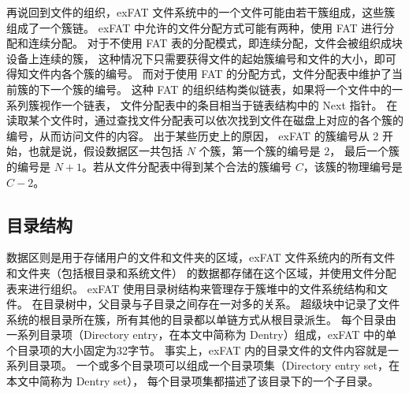 再说回到文件的组织，exFAT 文件系统中的一个文件可能由若干簇组成，这些簇组成了一个簇链。
exFAT 中允许的文件分配方式可能有两种，使用 FAT 进行分配和连续分配。
对于不使用 FAT 表的分配模式，即连续分配，文件会被组织成块设备上连续的簇，
这种情况下只需要获得文件的起始簇编号和文件的大小，即可得知文件内各个簇的编号。
而对于使用 FAT 的分配方式，文件分配表中维护了当前簇的下一个簇的编号。
这种 FAT 的组织结构类似链表，如果将一个文件中的一系列簇视作一个链表，
文件分配表中的条目相当于链表结构中的 Next 指针。
在读取某个文件时，通过查找文件分配表可以依次找到文件在磁盘上对应的各个簇的编号，从而访问文件的内容。
出于某些历史上的原因， exFAT 的簇编号从 2 开始，也就是说，假设数据区一共包括 $ N $ 个簇，第一个簇的编号是 2，
最后一个簇的编号是 $ N + 1 $。若从文件分配表中得到某个合法的簇编号 $ C $，该簇的物理编号是 $ C - 2 $。

\subsection{目录结构}\label{subsec:dentry}
数据区则是用于存储用户的文件和文件夹的区域，exFAT 文件系统内的所有文件和文件夹（包括根目录和系统文件）
的数据都存储在这个区域，并使用文件分配表来进行组织。
exFAT 使用目录树结构\parencite{al-turany2019understanding}来管理存于簇堆中的文件系统结构和文件。
在目录树中，父目录与子目录之间存在一对多的关系。
超级块中记录了文件系统的根目录所在簇，所有其他的目录都以单链方式从根目录派生。
每个目录由一系列目录项（Directory entry，在本文中简称为 Dentry）\parencite{wang2020research}组成，exFAT 中的单个目录项的大小固定为32字节。
事实上，exFAT 内的目录文件的文件内容就是一系列目录项。
一个或多个目录项可以组成一个目录项集（Directory entry set，在本文中简称为 Dentry set），
每个目录项集都描述了该目录下的一个子目录。


